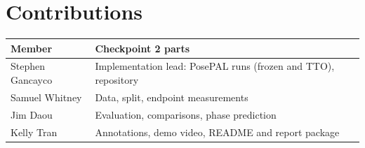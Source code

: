 \documentclass[11pt]{article}
\begin{document}
\section*{Contributions}
\small
\begin{tabular}{ll}
\toprule
Member & Checkpoint 2 parts\\
\midrule
Stephen Gancayco & Implementation lead: PosePAL runs (frozen and TTO), repository\\
Samuel Whitney & Data, split, endpoint measurements\\
Jim Daou & Evaluation, comparisons, phase prediction\\
Kelly Tran & Annotations, demo video, README and report package\\
\bottomrule
\end{tabular}
\end{document}
